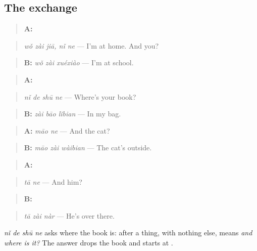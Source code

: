 \subsection*{The exchange}
\begin{quote}
\textbf{A:}  
\end{quote}

\begin{quote}
\emph{wǒ zài jiā, nǐ ne} — I'm at home. And you?
\end{quote}

\begin{quote}
\textbf{B:} \emph{wǒ zài xuéxiào} — I'm at school.
\end{quote}

\begin{quote}
\textbf{A:} 
\end{quote}

\begin{quote}
\emph{nǐ de shū ne} — Where's your book?
\end{quote}

\begin{quote}
\textbf{B:} \emph{zài bāo lǐbian} — In my bag.
\end{quote}

\begin{quote}
\textbf{A:} \emph{māo ne} — And the cat?
\end{quote}

\begin{quote}
\textbf{B:} \emph{māo zài wàibian} — The cat's outside.
\end{quote}

\begin{quote}
\textbf{A:} 
\end{quote}

\begin{quote}
\emph{tā ne} — And him?
\end{quote}

\begin{quote}
\textbf{B:} 
\end{quote}

\begin{quote}
\emph{tā zài nàr} — He's over there.
\end{quote}

\emph{nǐ de shū ne} asks where the book is:  after a thing, with nothing else, means \emph{and where is it?} The answer drops the book and starts at .

